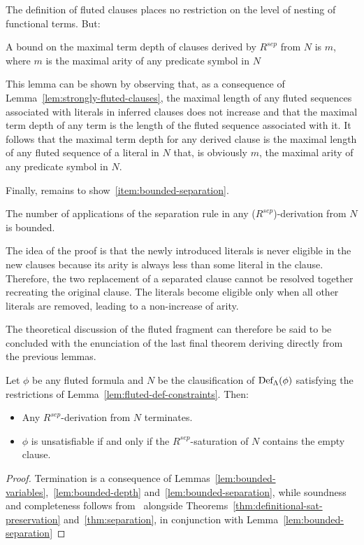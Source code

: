 The definition of fluted clauses places no restriction on the level of nesting of functional terms. But:
\begin{lemma}\label{lem:bounded-depth}
  A bound on the maximal term depth of clauses derived by \(R^{sep}\) from \(N\) is \(m\), where \(m\) is the maximal arity of any predicate symbol in \(N\)
\end{lemma}
This lemma can be shown by observing that, as a consequence of Lemma~\ref{lem:strongly-fluted-clauses}, the maximal length of any fluted sequences associated with literals in inferred clauses does not increase and that the maximal term depth of any term is the length of the fluted sequence associated with it.
It follows that the maximal term depth for any derived clause is the maximal length of any fluted sequence of a literal in \(N\) that, is obviously \(m\), the maximal arity of any predicate symbol in \(N\).

Finally, remains to show~\ref{item:bounded-separation}.

\begin{lemma}\label{lem:bounded-separation}
  The number of applications of the separation rule in any (\(R^{sep}\))-derivation from \(N\) is bounded.
\end{lemma}

The idea of the proof is that the newly introduced literals is never eligible in the new clauses because its arity is always less than some literal in the clause.
Therefore, the two replacement of a separated clause cannot be resolved together recreating the original clause. The literals become eligible only when all other  literals are removed, leading to a non-increase of arity.

The theoretical discussion of the fluted fragment can therefore be said to be concluded with the enunciation of the last final theorem deriving directly from the previous lemmas.

\begin{theorem}
  Let \(\phi\) be any fluted formula and \(N\) be the clausification of \(\fldef{\Lambda}{\phi}\) satisfying the restrictions of Lemma~\ref{lem:fluted-def-constraints}.
  Then:
  \begin{itemize}
    \item Any \(R^{sep}\)-derivation from \(N\) terminates.
    \item \(\phi\) is unsatisfiable if and only if the \(R^{sep}\)-saturation of \(N\) contains the empty clause.
  \end{itemize}
\end{theorem}

\begin{proof}
  Termination is a consequence of Lemmas~\ref{lem:bounded-variables},~\ref{lem:bounded-depth} and~\ref{lem:bounded-separation}, while soundness and completeness follows from~\cite{robinson1965} alongside Theorems~\ref{thm:definitional-sat-preservation} and~\ref{thm:separation}, in conjunction with Lemma~\ref{lem:bounded-separation}
\end{proof}



